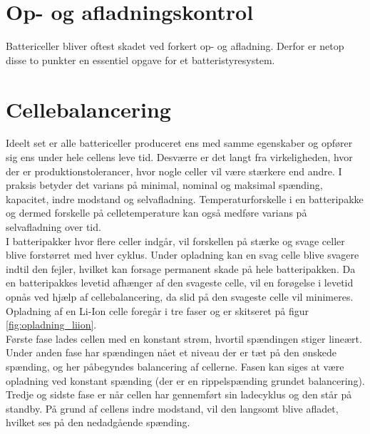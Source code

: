\section{Op- og afladningskontrol}
Battericeller bliver oftest skadet ved forkert op- og afladning. Derfor er netop disse to punkter en essentiel opgave for et batteristyresystem.

\section{Cellebalancering}
Ideelt set er alle battericeller produceret ens med samme egenskaber og opfører sig ens under hele cellens leve tid. Desværre er det langt fra virkeligheden, hvor der er produktionstolerancer, hvor nogle celler vil være stærkere end andre. I praksis betyder det varians på minimal, nominal og maksimal spænding, kapacitet, indre modstand og selvafladning.
Temperaturforskelle i en batteripakke og dermed forskelle på celletemperature kan også medføre varians på selvafladning over tid.
\\

I batteripakker hvor flere celler indgår, vil forskellen på stærke og svage celler blive forstørret med hver cyklus. Under opladning kan en svag celle blive svagere indtil den fejler, hvilket kan forsage permanent skade på hele batteripakken. Da en batteripakkes levetid afhænger af den svageste celle, vil en forøgelse i levetid opnås ved hjælp af cellebalancering, da slid på den svageste celle vil minimeres.
\\

Opladning af en Li-Ion celle foregår i tre faser og er skitseret på figur  \ref{fig:opladning_liion}.
\\
Første fase lades cellen med en konstant strøm, hvortil spændingen stiger lineært. 
\\
Under anden fase har spændingen nået et niveau der er tæt på den ønskede spænding, og her påbegyndes balancering af cellerne. Fasen kan siges at være opladning ved konstant spænding (der er en rippelspænding grundet balancering).
\\
Tredje og sidste fase er når cellen har gennemført sin ladecyklus og den står på standby. På grund af cellens indre modstand, vil den langsomt blive afladet, hvilket ses på den nedadgående spænding.

